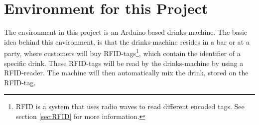  \section{Environment for this Project}
The environment in this project is an Arduino-based drinks-machine. The basic idea behind this environment, is that the drinks-machine resides in a bar or at a party, where customers will buy RFID-tags\footnote{RFID is a system that uses radio waves to read different encoded tags. See section \ref{sec:RFID} for more information.}, which contain the identifier of a specific drink. These RFID-tags will be read by the drinks-machine by using a RFID-reader. The machine will then automatically mix the drink, stored on the RFID-tag.

